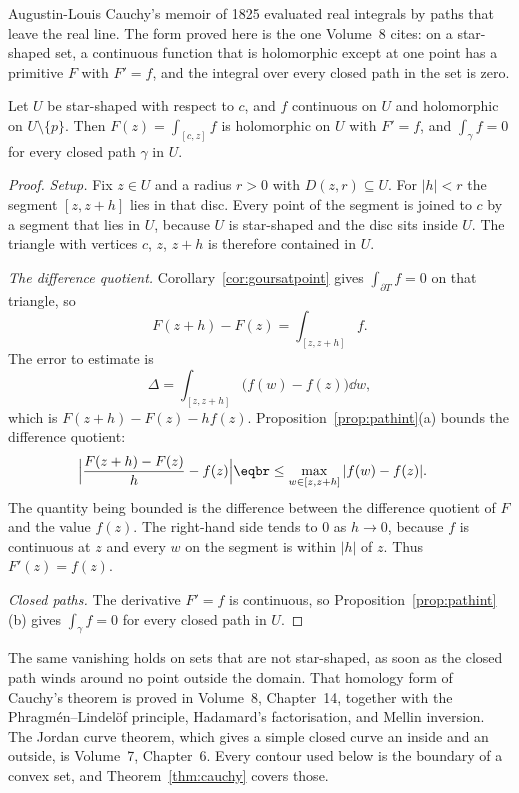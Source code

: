Augustin-Louis Cauchy's memoir of 1825 evaluated real integrals by paths that leave the real line. The form proved here is the one Volume~8 cites: on a star-shaped set, a continuous function that is holomorphic except at one point has a primitive $F$ with $F'=f$, and the integral over every closed path in the set is zero.


\begin{theorem}\label{thm:cauchy}
Let $U$ be star-shaped with respect to $c$, and $f$ continuous on $U$ and holomorphic on $U\setminus\{p\}$. Then $F(z)=\int_{[c,z]}f$ is
holomorphic on $U$ with $F'=f$, and $\int_\gamma f=0$ for every closed path $\gamma$ in $U$.
\end{theorem}
\begin{proof}
\textit{Setup.} Fix $z\in U$ and a radius $r>0$ with $D(z,r)\subseteq U$. For $|h|<r$ the segment $[z,z+h]$ lies in that disc. Every point of the segment is joined to $c$ by a segment that lies in $U$, because $U$ is star-shaped and the disc sits inside $U$. The triangle with vertices $c$, $z$, $z+h$ is therefore contained in $U$.

\textit{The difference quotient.} Corollary~\ref{cor:goursatpoint} gives $\int_{\partial T}f=0$ on that triangle, so
\[
F(z+h)-F(z)=\int_{[z,z+h]}f.
\]
The error to estimate is
\[
\Delta=\int_{[z,z+h]}\bigl(f(w)-f(z)\bigr)\dd w,
\]
which is $F(z+h)-F(z)-hf(z)$. Proposition~\ref{prop:pathint}(a) bounds the difference quotient:
\[
\begin{aligned}{}&\Bigl|\frac{F(z+h)-F(z)}h-f(z)\Bigr|\eqbr\le\max_{w\in[z,z+h]}|f(w)-f(z)|.\end{aligned}
\]
The quantity being bounded is the difference between the difference quotient of $F$ and the value $f(z)$. The right-hand side tends to $0$ as $h\to0$, because $f$ is continuous at $z$ and every $w$ on the segment is within $|h|$ of $z$. Thus $F'(z)=f(z)$.

\textit{Closed paths.} The derivative $F'=f$ is continuous, so Proposition~\ref{prop:pathint}(b) gives $\int_\gamma f=0$ for every closed path in $U$.
\end{proof}

\begin{remark}
The same vanishing holds on sets that are not star-shaped, as soon as the closed path winds around no point outside the domain. That homology form of Cauchy's theorem is proved in Volume~8, Chapter~14, together with the Phragm\'en--Lindel\"of principle, Hadamard's factorisation, and Mellin inversion. The Jordan curve theorem, which gives a simple closed curve an inside and an outside, is Volume~7, Chapter~6. Every contour used below is the boundary of a convex set, and Theorem~\ref{thm:cauchy} covers those.
\end{remark}


